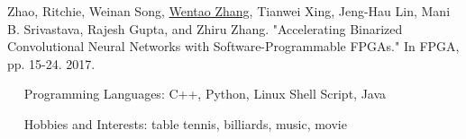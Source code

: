 \documentclass{joel_cv}
\begin{document}
\begin{sectionContentNaive}

\item Zhao, Ritchie, Weinan Song, \underline{Wentao Zhang}, Tianwei Xing, Jeng-Hau Lin, Mani B. Srivastava, Rajesh Gupta, and Zhiru Zhang. "Accelerating Binarized Convolutional Neural Networks with Software-Programmable FPGAs." In FPGA, pp. 15-24. 2017.

\end{sectionContentNaive}


%
%

\begin{description}{}
	\item{\ \ } Programming Languages: C++, Python, Linux Shell Script, Java
	\item{\ \ } Hobbies and Interests: table tennis, billiards, music, movie
\end{description}




\end{document}
